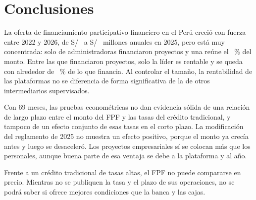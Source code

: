 \section{Conclusiones}

La oferta de financiamiento participativo financiero en el Perú creció con fuerza entre 2022 y 2026, de S/~ a S/~ millones anuales en 2025, pero está muy concentrada: solo  de  administradoras financiaron proyectos y una reúne el ~\% del monto. Entre las que financiaron proyectos, solo la líder es rentable y se queda con alrededor de ~\% de lo que financia. Al controlar el tamaño, la rentabilidad de las plataformas no se diferencia de forma significativa de la de otros intermediarios supervisados.

Con 69 meses, las pruebas econométricas no dan evidencia sólida de una relación de largo plazo entre el monto del FPF y las tasas del crédito tradicional, y tampoco de un efecto conjunto de esas tasas en el corto plazo. La modificación del reglamento de 2025 no muestra un efecto positivo, porque el monto ya crecía antes y luego se desaceleró. Los proyectos empresariales sí se colocan más que los personales, aunque buena parte de esa ventaja se debe a la plataforma y al año.

Frente a un crédito tradicional de tasas altas, el FPF no puede compararse en precio. Mientras no se publiquen la tasa y el plazo de sus operaciones, no se podrá saber si ofrece mejores condiciones que la banca y las cajas.
